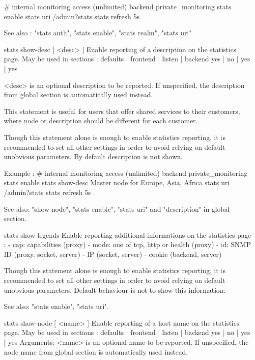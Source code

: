     # internal monitoring access (unlimited)
    backend private_monitoring
        stats enable
        stats uri     /admin?stats
        stats refresh 5s

  See also : "stats auth", "stats enable", "stats realm", "stats uri"


stats show-desc [ <desc> ]
  Enable reporting of a description on the statistics page.
  May be used in sections :   defaults | frontend | listen | backend
                                 yes   |    no    |   yes  |   yes

    <desc>    is an optional description to be reported. If unspecified, the
              description from global section is automatically used instead.

  This statement is useful for users that offer shared services to their
  customers, where node or description should be different for each customer.

  Though this statement alone is enough to enable statistics reporting, it is
  recommended to set all other settings in order to avoid relying on default
  unobvious parameters.  By default description is not shown.

  Example :
    # internal monitoring access (unlimited)
    backend private_monitoring
        stats enable
        stats show-desc Master node for Europe, Asia, Africa
        stats uri       /admin?stats
        stats refresh   5s

  See also: "show-node", "stats enable", "stats uri" and "description" in
            global section.


stats show-legends
  Enable reporting additional informations on the statistics page :
    - cap: capabilities (proxy)
    - mode: one of tcp, http or health (proxy)
    - id: SNMP ID (proxy, socket, server)
    - IP (socket, server)
    - cookie (backend, server)

  Though this statement alone is enough to enable statistics reporting, it is
  recommended to set all other settings in order to avoid relying on default
  unobvious parameters.  Default behaviour is not to show this information.

  See also: "stats enable", "stats uri".


stats show-node [ <name> ]
  Enable reporting of a host name on the statistics page.
  May be used in sections :   defaults | frontend | listen | backend
                                 yes   |    no    |   yes  |   yes
  Arguments:
    <name>    is an optional name to be reported. If unspecified, the
              node name from global section is automatically used instead.

